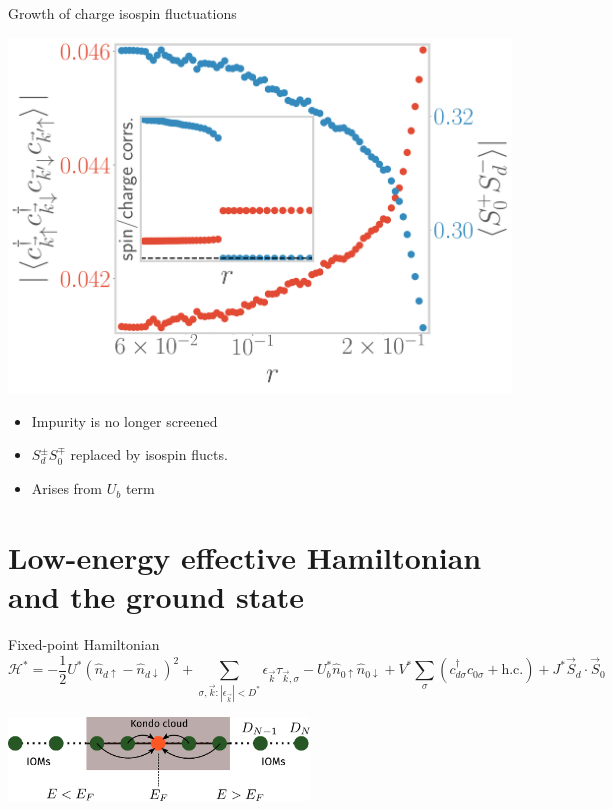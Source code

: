 \documentclass[11pt,aspectratio=169]{beamer}
\begin{document}
\begin{frame}{Growth of charge isospin fluctuations}
\begin{minipage}{0.5\textwidth}
\includegraphics[width=\textwidth]{figures/odlro.pdf}
\end{minipage}
\begin{minipage}{0.49\textwidth}
\begin{itemize}
\item Impurity is no longer screened\\[10pt]
\item \(S_d^\pm S_0^\mp\) replaced by isospin flucts.\\[10pt]
\item Arises from \(U_b\) term
\end{itemize}
\end{minipage}
\end{frame}

\section{Low-energy effective Hamiltonian and the ground state}

\begin{frame}{Fixed-point Hamiltonian}
	\[ \mathcal{H}^* = -\frac{1}{2}U^*\left(\hat n_{d \uparrow} - \hat n_{d \downarrow}\right)^2 + \sum_{\sigma,\vec k:|\epsilon_{\vec k}| < D^*} \epsilon_{\vec k} \tau_{\vec k,\sigma} - U_b^* \hat n_{0 \uparrow} \hat n_{0 \downarrow} + V^*\sum_\sigma \left( c^\dagger_{d\sigma}c_{0\sigma} + \text{h.c.}\right) + J^* \vec{S}_d\cdot\vec{S}_0\]
	
	\includegraphics[width=0.6\textwidth]{figures/kondo_fp_1D.pdf}
\end{frame}
\end{document}
